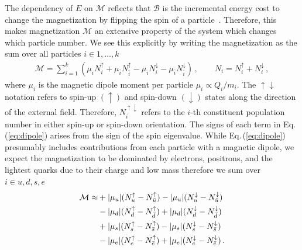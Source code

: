 \documentclass[epjST]{svjour}
\newcommand{\req}[1]{Eq.\,(\ref{#1})}
\numberwithin{equation}{section}
\begin{document}
The dependency of $E$ on $\mathcal{M}$ reflects that $\mathcal{B}$ is the incremental energy cost to change the magnetization by flipping the spin of a particle~\cite{Bali:2014kia}. Therefore, this makes magnetization $\mathcal{M}$ an extensive property of the system which changes which particle number. We see this explicitly by writing the magnetization as the sum over all particles $i\in{1,\ldots,k}$
\begin{align}
    \label{eq:dipole}
    \mathcal{M} = \sum_{i=1}^{k}(\mu_{i}N_{i}^{\uparrow} + \mu_{\bar{i}}N_{\bar{i}}^{\uparrow} - \mu_{i}N_{i}^{\downarrow} - \mu_{\bar{i}}N_{\bar{i}}^{\downarrow})\,,\qquad
    N_{i} = N_{i}^{\uparrow} + N_{i}^{\downarrow}\,,
\end{align}
where $\mu_{i}$ is the magnetic dipole moment per particle $\mu_{i}\propto Q_{i}/m_{i}$. The $\uparrow\downarrow$ notation refers to spin-up $(\uparrow)$ and spin-down $(\downarrow)$ states along the direction of the external field. Therefore, $N_{i}^{\uparrow\downarrow}$ refers to the $i$-th constituent population number in either spin-up or spin-down orientation. The signs of each term in \req{eq:dipole} arises from the sign of the spin eigenvalue. While \req{eq:dipole} presumably includes contributions from each particle with a magnetic dipole, we expect the magnetization to be dominated by electrons, positrons, and the lightest quarks due to their charge and low mass therefore we sum over $i\in{u,d,s,e}$
\begin{align}
    \notag\mathcal{M} \approx &+|\mu_{u}|(N_{u}^{\uparrow}-N_{\bar{u}}^{\uparrow})-|\mu_{u}|(N_{u}^{\downarrow}-N_{\bar{u}}^{\downarrow})\\
    \notag &-|\mu_{d}|(N_{d}^{\uparrow}-N_{\bar{d}}^{\uparrow})+|\mu_{d}|(N_{d}^{\downarrow}-N_{\bar{d}}^{\downarrow})\\
    \notag &+|\mu_{s}|(N_{s}^{\uparrow}-N_{\bar{s}}^{\uparrow})-|\mu_{s}|(N_{s}^{\downarrow}-N_{\bar{s}}^{\downarrow})\\
    \label{eq:dipole2}
    &-|\mu_{e}|(N_{e}^{\uparrow}-N_{\bar{e}}^{\uparrow})+|\mu_{e}|(N_{e}^{\downarrow}-N_{\bar{e}}^{\downarrow})\,.
\end{align}
\end{document}
